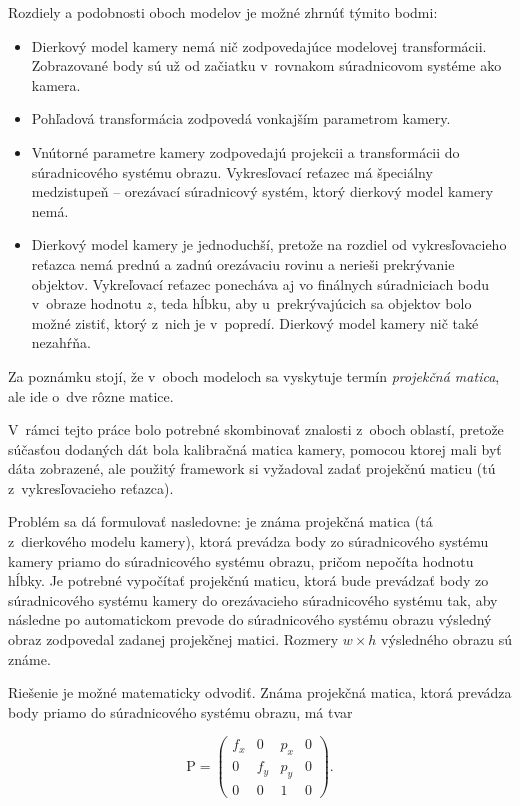 Rozdiely a podobnosti oboch modelov je možné zhrnúť týmito bodmi:
\begin{itemize}
    \item Dierkový model kamery nemá nič zodpovedajúce modelovej transformácii. Zobrazované body sú už od začiatku v~rovnakom súradnicovom systéme ako kamera.
    \item Pohľadová transformácia zodpovedá vonkajším parametrom kamery.
    \item Vnútorné parametre kamery zodpovedajú projekcii a transformácii do súradnicového systému obrazu. Vykresľovací reťazec má špeciálny medzistupeň -- orezávací súradnicový systém, ktorý dierkový model kamery nemá.
    \item Dierkový model kamery je jednoduchší, pretože na rozdiel od vykresľovacieho reťazca nemá prednú a zadnú orezávaciu rovinu a nerieši prekrývanie objektov. Vykreľovací reťazec ponecháva aj vo finálnych súradniciach bodu v~obraze hodnotu $z$, teda hĺbku, aby u~prekrývajúcich sa objektov bolo možné zistiť, ktorý z~nich je v~popredí. Dierkový model kamery nič také nezahŕňa.
\end{itemize}

Za poznámku stojí, že v~oboch modeloch sa vyskytuje termín \emph{projekčná matica}, ale ide o~dve rôzne matice.

V~rámci tejto práce bolo potrebné skombinovať znalosti z~oboch oblastí, pretože súčasťou dodaných dát bola kalibračná matica kamery, pomocou ktorej mali byť dáta zobrazené, ale použitý framework si vyžadoval zadať projekčnú maticu (tú z~vykresľovacieho reťazca).

Problém sa dá formulovať nasledovne: je známa projekčná matica (tá z~dierkového modelu kamery), ktorá prevádza body zo súradnicového systému kamery priamo do súradnicového systému obrazu, pričom nepočíta hodnotu hĺbky. Je potrebné vypočítať projekčnú maticu, ktorá bude prevádzať body zo súradnicového systému kamery do orezávacieho súradnicového systému tak, aby následne po automatickom prevode do súradnicového systému obrazu výsledný obraz zodpovedal zadanej projekčnej matici. Rozmery $w \times h$ výsledného obrazu sú známe.

Riešenie je možné matematicky odvodiť. Známa projekčná matica, ktorá prevádza body priamo do súradnicového systému obrazu, má tvar

$$ \mathrm{P} =
\begin{pmatrix}
f_x & 0 & p_x & 0 \\
0 & f_y & p_y & 0 \\
0 & 0 &  1  & 0
\end{pmatrix} \mathrm{.}
$$

